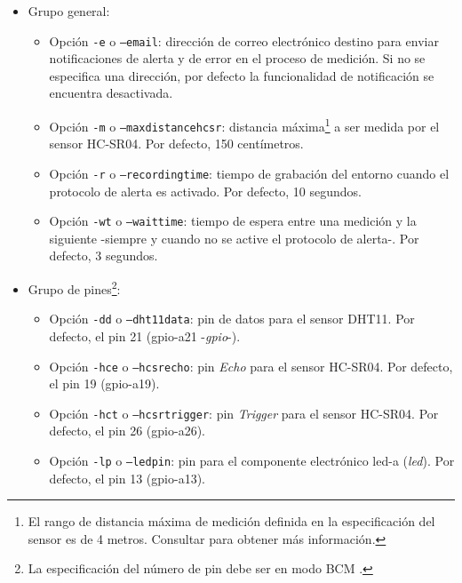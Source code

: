 \documentclass[12pt,a4paper, twoside]{report}
\begin{document}
	\begin{itemize}
			
		\item Grupo general:
		\begin{itemize}
			\item Opción \texttt{-e} o \texttt{--email}: dirección de correo electrónico destino para enviar notificaciones de alerta y de error en el proceso de medición. Si no se especifica una dirección, por defecto la funcionalidad de notificación se encuentra desactivada.
			
			\item Opción \texttt{-m} o \texttt{--maxdistancehcsr}: distancia máxima\footnote{El rango de distancia máxima de medición definida en la especificación del \gls{sensor} es de 4 metros. Consultar \cite{hcsr04:datasheet} para obtener más información.} a ser medida por el \gls{sensor} HC-SR04. Por defecto, 150 centímetros.
			
			\item Opción \texttt{-r} o \texttt{--recordingtime}: tiempo de grabación del entorno cuando el protocolo de alerta es activado. Por defecto, 10 segundos.
		
			\item Opción \texttt{-wt} o \texttt{--waittime}: tiempo de espera entre una medición y la siguiente -siempre y cuando no se active el protocolo de alerta-. Por defecto, 3 segundos.                          
		\end{itemize}
		
		\item Grupo de pines\footnote{La especificación del número de pin debe ser en modo BCM \cite{pinout:rpi}.}:
		\begin{itemize}
			\item Opción \texttt{-dd} o \texttt{--dht11data}: pin de datos para el \gls{sensor} DHT11. Por defecto, el pin 21 (\gls{gpio-a}21 -\textit{\gls{gpio}}-).
			
			\item Opción \texttt{-hce} o \texttt{--hcsrecho}: pin \textit{Echo} para el \gls{sensor} HC-SR04. Por defecto, el pin 19 (\gls{gpio-a}19).
			 
			\item Opción \texttt{-hct} o \texttt{--hcsrtrigger}: pin \textit{Trigger} para el \gls{sensor} HC-SR04. Por defecto, el pin 26 (\gls{gpio-a}26).
		
			\item Opción \texttt{-lp} o \texttt{--ledpin}: pin para el componente electrónico \gls{led-a} (\textit{\gls{led}}). Por defecto, el pin 13 (\gls{gpio-a}13).
		\end{itemize}
		

\end{itemize}
\end{document}
